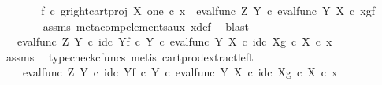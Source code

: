 \begin{isabellebody}
\ \ \ \ \isamarkupfalse%
\ \isamarkupfalse%
\ {\isachardoublequoteopen}{\isacharparenleft}{\kern0pt}f\isactrlsup {\isasymflat}\ {\isasymcirc}\isactrlsub c\ {\isasymlangle}g\isactrlsup {\isasymflat}{\isacharcomma}{\kern0pt}right{\isacharunderscore}{\kern0pt}cart{\isacharunderscore}{\kern0pt}proj\ X\ one{\isasymrangle}{\isacharparenright}{\kern0pt}\ {\isasymcirc}\isactrlsub c\ x{}\ {\isacharequal}{\kern0pt}\ eval{\isacharunderscore}{\kern0pt}func\ Z\ Y\ {\isasymcirc}\isactrlsub c\ {\isasymlangle}eval{\isacharunderscore}{\kern0pt}func\ Y\ X\ {\isasymcirc}\isactrlsub c\ {\isasymlangle}x{\isacharcomma}{\kern0pt}g{\isasymrangle}{\isacharcomma}{\kern0pt}f{\isasymrangle}{\isachardoublequoteclose}\isanewline
\ \ \ \ \ \ \isamarkupfalse%
\ assms\ meta{\isacharunderscore}{\kern0pt}comp{}{\isacharunderscore}{\kern0pt}elements{\isacharunderscore}{\kern0pt}aux\ x{\isacharunderscore}{\kern0pt}def\ \isamarkupfalse%
\ blast\isanewline
\ \ \ \ \isamarkupfalse%
\ \isamarkupfalse%
\ {\isachardoublequoteopen}{\isachardot}{\kern0pt}{\isachardot}{\kern0pt}{\isachardot}{\kern0pt}\ {\isacharequal}{\kern0pt}\ eval{\isacharunderscore}{\kern0pt}func\ Z\ Y\ {\isasymcirc}\isactrlsub c\ {\isasymlangle}id\isactrlsub c\ Y{\isacharcomma}{\kern0pt}f\ {\isasymcirc}\isactrlsub c\ {\isasymbeta}\isactrlbsub Y\isactrlesub {\isasymrangle}\ {\isasymcirc}\isactrlsub c\ eval{\isacharunderscore}{\kern0pt}func\ Y\ X\ {\isasymcirc}\isactrlsub c\ {\isasymlangle}id\isactrlsub c\ X{\isacharcomma}{\kern0pt}g\ {\isasymcirc}\isactrlsub c\ {\isasymbeta}\isactrlbsub X\isactrlesub {\isasymrangle}\ {\isasymcirc}\isactrlsub c\ x{\isachardoublequoteclose}\isanewline
\ \ \ \ \ \ \isamarkupfalse%
\ assms\ \isamarkupfalse%
\ {\isacharparenleft}{\kern0pt}typecheck{\isacharunderscore}{\kern0pt}cfuncs{\isacharcomma}{\kern0pt}\ metis\ cart{\isacharunderscore}{\kern0pt}prod{\isacharunderscore}{\kern0pt}extract{\isacharunderscore}{\kern0pt}left{\isacharparenright}{\kern0pt}\isanewline
\ \ \ \ \isamarkupfalse%
\ \isamarkupfalse%
\ {\isachardoublequoteopen}{\isachardot}{\kern0pt}{\isachardot}{\kern0pt}{\isachardot}{\kern0pt}\ {\isacharequal}{\kern0pt}\ \ {\isacharparenleft}{\kern0pt}eval{\isacharunderscore}{\kern0pt}func\ Z\ Y\ {\isasymcirc}\isactrlsub c\ {\isasymlangle}id\isactrlsub c\ Y{\isacharcomma}{\kern0pt}f\ {\isasymcirc}\isactrlsub c\ {\isasymbeta}\isactrlbsub Y\isactrlesub {\isasymrangle}{\isacharparenright}{\kern0pt}\ {\isasymcirc}\isactrlsub c\ eval{\isacharunderscore}{\kern0pt}func\ Y\ X\ {\isasymcirc}\isactrlsub c\ {\isasymlangle}id\isactrlsub c\ X{\isacharcomma}{\kern0pt}g\ {\isasymcirc}\isactrlsub c\ {\isasymbeta}\isactrlbsub X\isactrlesub {\isasymrangle}\ {\isasymcirc}\isactrlsub c\ x{\isachardoublequoteclose}\isanewline

\end{isabellebody}
